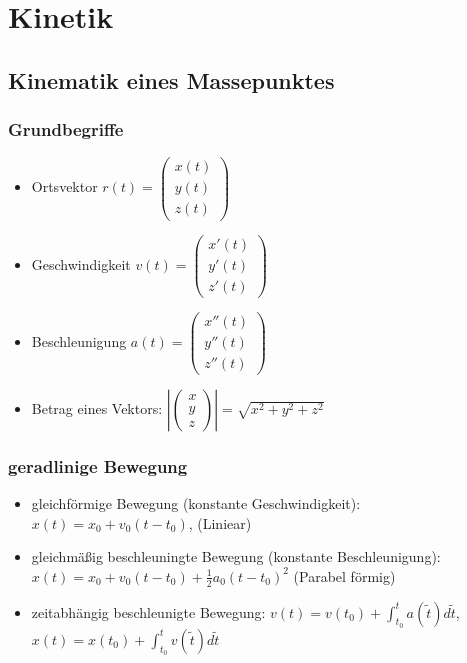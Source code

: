 \documentclass[11pt]{article}
\begin{document}
\section{Kinetik}
\label{sec:org6036426}
\subsection{Kinematik eines Massepunktes}
\label{sec:org21a2187}
\subsubsection{Grundbegriffe}
\label{sec:org865d58b}
\begin{itemize}
\item Ortsvektor \(r(t) = \begin{pmatrix}x(t)\\ y(t)\\ z(t)\end{pmatrix}\)
\item Geschwindigkeit \(v(t) = \begin{pmatrix}x'(t)\\ y'(t)\\ z'(t)\end{pmatrix}\)
\item Beschleunigung \(a(t) = \begin{pmatrix}x''(t)\\ y''(t)\\ z''(t)\end{pmatrix}\)

\item Betrag eines Vektors: \(|\begin{pmatrix}x \\ y \\ z \end{pmatrix}| = \sqrt{x^2+y^2+z^2}\)
\end{itemize}

\subsubsection{geradlinige Bewegung}
\label{sec:org890ae88}
\begin{itemize}
\item gleichförmige Bewegung (konstante Geschwindigkeit): \(x(t) = x_0 + v_0(t-t_0)\), (Liniear)
\item gleichmäßig beschleuningte Bewegung (konstante Beschleunigung): \(x(t) = x_0 + v_0(t-t_0) + \frac{1}{2} a_0 (t-t_0)^2\) (Parabel förmig)
\item zeitabhängig beschleunigte Bewegung: \(v(t) = v(t_0) + \int_{t_0}^t a(\tilde{t}) d \tilde{t}\),  \(x(t) = x(t_0) + \int_{t_0}^t v(\tilde{t}) d \tilde{t}\)
\end{itemize}
\end{document}
